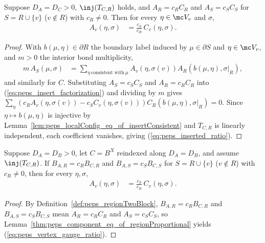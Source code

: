 \begin{lemma}%
    \label{thm:peps_component_eq_of_regionProportional}
    \leanok
    Suppose $D_A=D_C>0$, $\inj(T_{C,R})$ holds, and $A_R=c_RC_R$ and
    $A_S=c_SC_S$ for $S=R\cup\{v\}$ ($v\notin R$) with $c_R\ne 0$. Then for
    every $\eta\in\mc V_v$ and $\sigma$,
    \begin{align}
        A_v(\eta,\sigma)
         & =\frac{c_S}{c_R}\,C_v(\eta,\sigma).
        \label{eq:peps_inserted_ratio}
    \end{align}
\end{lemma}
\begin{proof}\leanok
    With $b(\mu,\eta)\in\partial R$ the boundary label induced by $\mu\in\partial S$
    and $\eta\in\mc V_v$, and $m>0$ the interior bond multiplicity,
    \begin{align}
        m\,A_S(\mu,\sigma)
         & =
        \sum_{\eta\ \text{consistent with}\ \mu}
        A_v(\eta,\sigma(v))
        A_R(b(\mu,\eta),\sigma|_R),
        \label{eq:peps_insert_factorization}
    \end{align}
    and similarly for $C$. Substituting $A_S=c_SC_S$ and $A_R=c_RC_R$ into
    (\ref{eq:peps_insert_factorization}) and dividing by $m$ gives
    $\sum_{\eta}(c_RA_v(\eta,\sigma(v))-c_SC_v(\eta,\sigma(v)))C_R(b(\mu,\eta),\sigma|_R)=0$.
    Since $\eta\mapsto b(\mu,\eta)$ is injective by
    Lemma~\ref{lem:peps_localConfig_eq_of_insertConsistent} and $T_{C,R}$ is
    linearly independent, each coefficient vanishes, giving
    (\ref{eq:peps_inserted_ratio}).
\end{proof}

\begin{lemma}%
    \label{cor:peps_component_eq_gaugeVertex_of_twoBlockProportional}
    \leanok
    Suppose $D_A=D_B>0$, let $C=B^X$ reindexed along $D_A=D_B$, and assume
    $\inj(T_{C,R})$. If $B_{A,R}=c_RB_{C,R}$ and $B_{A,S}=c_SB_{C,S}$ for
    $S=R\cup\{v\}$ ($v\notin R$) with $c_R\ne 0$, then for every $\eta,\sigma$,
    \begin{align}
        A_v(\eta,\sigma)
         & =\frac{c_S}{c_R}\,C_v(\eta,\sigma).
        \label{eq:peps_vertex_gauge_ratio}
    \end{align}
\end{lemma}
\begin{proof}\leanok
    By Definition~\ref{def:peps_regionTwoBlock}, $B_{A,R}=c_RB_{C,R}$ and
    $B_{A,S}=c_SB_{C,S}$ mean $A_R=c_RC_R$ and $A_S=c_SC_S$, so
    Lemma~\ref{thm:peps_component_eq_of_regionProportional} yields
    (\ref{eq:peps_vertex_gauge_ratio}).
\end{proof}
